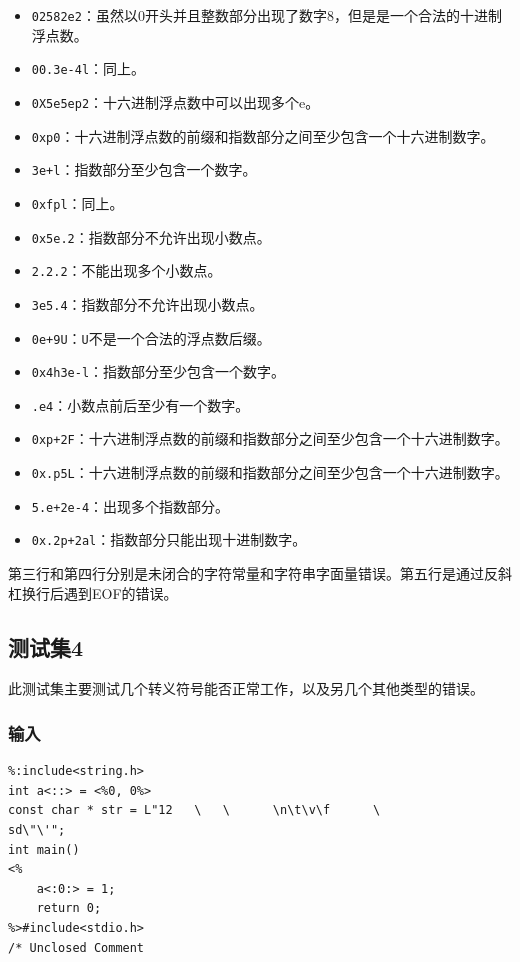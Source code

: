 \documentclass[lang=cn,11pt,a4paper,cite=authornum]{paper}
\begin{document}
\begin{itemize}
    \item \texttt{02582e2}：虽然以0开头并且整数部分出现了数字8，但是是一个合法的十进制浮点数。
    \item \texttt{00.3e-4l}：同上。
    \item \texttt{0X5e5ep2}：十六进制浮点数中可以出现多个e。
    \item \texttt{0xp0}：十六进制浮点数的前缀和指数部分之间至少包含一个十六进制数字。
    \item \texttt{3e+l}：指数部分至少包含一个数字。
    \item \texttt{0xfpl}：同上。
    \item \texttt{0x5e.2}：指数部分不允许出现小数点。
    \item \texttt{2.2.2}：不能出现多个小数点。
    \item \texttt{3e5.4}：指数部分不允许出现小数点。
    \item \texttt{0e+9U}：\texttt{U}不是一个合法的浮点数后缀。
    \item \texttt{0x4h3e-l}：指数部分至少包含一个数字。
    \item \texttt{.e4}：小数点前后至少有一个数字。
    \item \texttt{0xp+2F}：十六进制浮点数的前缀和指数部分之间至少包含一个十六进制数字。
    \item \texttt{0x.p5L}：十六进制浮点数的前缀和指数部分之间至少包含一个十六进制数字。
    \item \texttt{5.e+2e-4}：出现多个指数部分。
    \item \texttt{0x.2p+2al}：指数部分只能出现十进制数字。
\end{itemize}

第三行和第四行分别是未闭合的字符常量和字符串字面量错误。第五行是通过反斜杠换行后遇到EOF的错误。

\subsection{测试集4}

此测试集主要测试几个转义符号能否正常工作，以及另几个其他类型的错误。

\subsubsection{输入}

\begin{code}
\begin{verbatim}
%:include<string.h>
int a<::> = <%0, 0%>
const char * str = L"12   \   \      \n\t\v\f      \
sd\"\'";
int main()
<%
    a<:0:> = 1;
    return 0;
%>#include<stdio.h>
/* Unclosed Comment
\end{verbatim}
\end{code}
\end{document}
